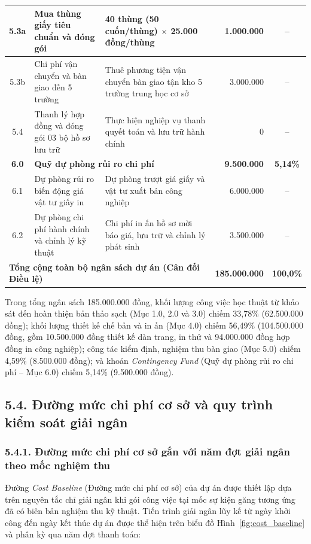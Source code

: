 \begin{center}
{\begin{longtable}{|c|p{4.5cm}|p{5.5cm}|r|c|}
\hline
5.3a & Mua thùng giấy tiêu chuẩn và đóng gói & 40 thùng (50 cuốn/thùng) $\times$ 25.000 đồng/thùng & 1.000.000 & -- \\
\hline
5.3b & Chi phí vận chuyển và bàn giao đến 5 trường & Thuê phương tiện vận chuyển bàn giao tận kho 5 trường trung học cơ sở & 3.000.000 & -- \\
\hline
5.4 & Thanh lý hợp đồng và đóng gói 03 bộ hồ sơ lưu trữ & Thực hiện nghiệp vụ thanh quyết toán và lưu trữ hành chính & 0 & -- \\
\hline
\textbf{6.0} & \multicolumn{2}{l|}{\textbf{Quỹ dự phòng rủi ro chi phí}} & \textbf{9.500.000} & \textbf{5,14\%} \\
\hline
6.1 & Dự phòng rủi ro biến động giá vật tư giấy in & Dự phòng trượt giá giấy và vật tư xuất bản công nghiệp & 6.000.000 & -- \\
\hline
6.2 & Dự phòng chi phí hành chính và chỉnh lý kỹ thuật & Chi phí in ấn hồ sơ mời báo giá, lưu trữ và chỉnh lý phát sinh & 3.500.000 & -- \\
\hline
\multicolumn{3}{|l|}{\textbf{Tổng cộng toàn bộ ngân sách dự án (Cân đối Điều lệ)}} & \textbf{185.000.000} & \textbf{100,0\%} \\
\hline
\end{longtable}
}
\end{center}

Trong tổng ngân sách 185.000.000 đồng, khối lượng công việc học thuật từ khảo sát đến hoàn thiện bản thảo sạch (Mục 1.0, 2.0 và 3.0) chiếm 33,78\% (62.500.000 đồng); khối lượng thiết kế chế bản và in ấn (Mục 4.0) chiếm 56,49\% (104.500.000 đồng, gồm 10.500.000 đồng thiết kế dàn trang, in thử và 94.000.000 đồng hợp đồng in công nghiệp); công tác kiểm định, nghiệm thu bàn giao (Mục 5.0) chiếm 4,59\% (8.500.000 đồng); và khoản \textit{Contingency Fund} (Quỹ dự phòng rủi ro chi phí -- Mục 6.0) chiếm 5,14\% (9.500.000 đồng).

\subsection{5.4. Đường mức chi phí cơ sở và quy trình kiểm soát giải ngân}

\subsubsection{5.4.1. Đường mức chi phí cơ sở gắn với năm đợt giải ngân theo mốc nghiệm thu}

Đường \textit{Cost Baseline} (Đường mức chi phí cơ sở) của dự án được thiết lập dựa trên nguyên tắc chỉ giải ngân khi gói công việc tại mốc sự kiện găng tương ứng đã có biên bản nghiệm thu kỹ thuật. Tiến trình giải ngân lũy kế từ ngày khởi công đến ngày kết thúc dự án được thể hiện trên biểu đồ Hình~\ref{fig:cost_baseline} và phân kỳ qua năm đợt thanh toán:

